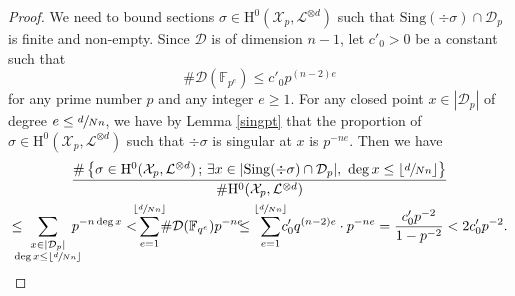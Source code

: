 \documentclass[JEP,XML,SOM,Unicode,published]{cedram}
\newcommand{\sep}{\,;\,}
\theoremstyle{plain}
\theoremstyle{definition}
\newcommand{\ho}{\mathrm{H}}
\newcommand{\X}{\mathcal{X}}
\newcommand{\li}{\mathcal{L}}
\newcommand{\F}{\mathbb{F}}
\begin{document}
\begin{proof}
We need to bound sections $\sigma\in \ho^0(\X_p, \li^{\otimes d})$ such that $\mathrm{Sing}(\div \sigma)\cap \mathcal{D}_p$ is finite and non-empty. Since $\mathcal{D}$ is of dimension $n-1$, let $c'_0>0$ be a constant such that
\[
\#\mathcal{D}(\F_{p^e}) \leq c'_0 p^{(n-2)e}
\]
for any prime number $p$ and any integer $e\geq 1$. For any closed point $x\in |\mathcal{D}_p|$ of degree $e\leq \sfrac{d}{Nn}$, we have by Lemma \ref{singpt} that the proportion of $\sigma\in \ho^0(\X_p, \li^{\otimes d})$ such that $\div \sigma$ is singular at $x$ is $p^{-ne}$. Then we have
\begin{multline*}
\frac{\#\left\{ \sigma\in \ho^0(\X_p, \li^{\otimes d})\sep \exists x\in |\mathrm{Sing}(\div \sigma)\cap \mathcal{D}_p|,\ \deg x\leq \lfloor \sfrac{d}{Nn} \rfloor \right\}}{\#\ho^0(\X_p, \li^{\otimes d})}\\
\leq \hspace*{-3mm}\sum_{\substack{x\in |\mathcal{D}_p|\\ \deg x\leq \lfloor \sfrac{d}{Nn} \rfloor}} \hspace*{-3mm}p^{-n\deg x} 
< \hspace*{-2mm}\sum_{e=1}^{\lfloor \sfrac{d}{Nn} \rfloor}\hspace*{-2mm} \#\mathcal{D}(\F_{q^e}) p^{-ne}\hspace*{-2mm}\leq \sum_{e=1}^{\lfloor \sfrac{d}{Nn} \rfloor}\hspace*{-2mm}c'_0 q^{(n-2)e}\cdot p^{-ne}
=\frac{c'_0p^{-2}}{1-p^{-2}}< 2c'_0p^{-2}.
\end{multline*}


\end{proof}
\end{document}
